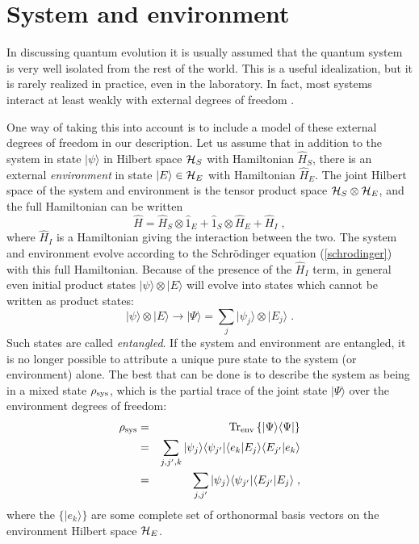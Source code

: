 \documentclass[12pt]{article}
\def\bra#1{{\langle #1 |}}
\def\ket#1{{| #1 \rangle}}
\def\bracket#1#2{{\langle #1 | #2 \rangle}}
\def\id{{\hat 1}}
\def\tr{{\rm Tr}}
\def\H{{\hat H}}
\begin{document}
\section{System and environment}

In discussing quantum evolution it is usually assumed that the quantum
system is very well isolated from the rest of the world.  This is a
useful idealization, but it is rarely realized in practice, even
in the laboratory.  In fact, most systems interact at least
weakly with external degrees of freedom \cite{Zurek,Joos}.

One way of taking this into account is to include
a model of these external degrees
of freedom in our description.  Let us assume that in addition
to the system in state $\ket\psi$ in Hilbert space ${\cal H}_S$
with Hamiltonian $\H_S$, there is an external {\it environment}
in state $\ket{E}\in{\cal H}_E$ with Hamiltonian $\H_E$.
The joint Hilbert space of the system and environment is the tensor product
space ${\cal H}_S\otimes{\cal H}_E$, and the full Hamiltonian
can be written
\begin{equation}
\H = \H_S\otimes\id_E + \id_S\otimes\H_E + \H_I \;,
\end{equation}
where $\H_I$ is a Hamiltonian giving the interaction between the two.
The system and environment evolve according to the Schr\"odinger
equation (\ref{schrodinger}) with this full Hamiltonian.  Because of
the presence of the $\H_I$ term, in general even initial product states
$\ket\psi\otimes\ket{E}$ will evolve into states which cannot be
written as product states:
\begin{equation}
\ket\psi\otimes\ket{E} \rightarrow
  \ket\Psi = \sum_j \ket{\psi_j}\otimes\ket{E_j} \;.
\label{entangled}
\end{equation}
Such states are called {\it entangled}.  If the system and environment
are entangled, it is no longer possible to attribute a unique pure state
to the system (or environment) alone.  The best that can be done is to
describe the system as being in a mixed state $\rho_{\rm sys}$, which
is the partial trace of the joint state $\ket\Psi$ over the environment
degrees of freedom:
\begin{eqnarray}
\rho_{\rm sys} &=& \tr_{\rm env} \left\{ \ket\Psi\bra\Psi \right\} \nonumber\\
&=& \sum_{j,j',k} \ket{\psi_j}\bra{\psi_{j'}}
  \bracket{e_k}{E_j}\bracket{E_{j'}}{e_k} \nonumber\\
&=& \sum_{j,j'} \ket{\psi_j}\bra{\psi_{j'}}
  \bracket{E_{j'}}{E_j} \;,
\end{eqnarray}
where the $\{\ket{e_k}\}$ are some complete set of orthonormal basis vectors
on the environment Hilbert space ${\cal H}_E$.
\end{document}
